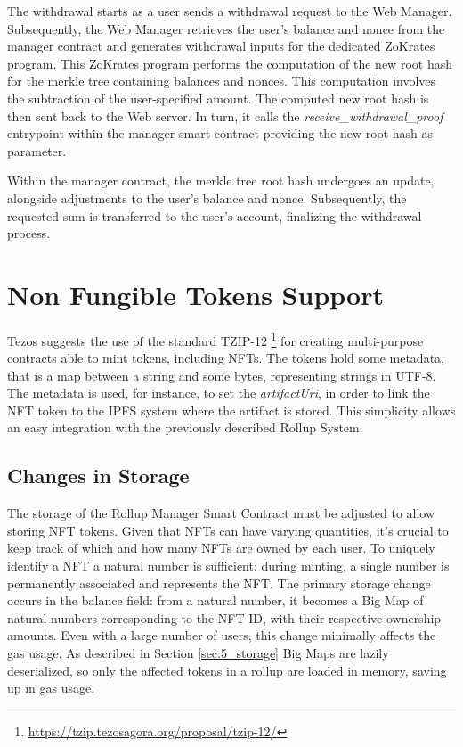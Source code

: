 The withdrawal starts as a user sends a withdrawal request to the Web Manager. Subsequently, the Web Manager retrieves the user's balance and nonce from the manager contract and generates withdrawal inputs for the dedicated ZoKrates program. This ZoKrates program performs the computation of the new root hash for the merkle tree containing balances and nonces. This computation involves the subtraction of the user-specified amount. The computed new root hash is then sent back to the Web server. In turn, it calls the \textit{receive\_withdrawal\_proof} entrypoint within the manager smart contract providing the new root hash as parameter.

Within the manager contract, the merkle tree root hash undergoes an update, alongside adjustments to the user's balance and nonce. Subsequently, the requested sum is transferred to the user's account, finalizing the withdrawal process.

\section{Non Fungible Tokens Support}

Tezos suggests the use of the standard TZIP-12 \footnote{\url{https://tzip.tezosagora.org/proposal/tzip-12/}} for creating multi-purpose contracts able to mint tokens, including NFTs. The tokens hold some metadata, that is a map between a string and some bytes, representing strings in UTF-8. The metadata is used, for instance, to set the \textit{artifactUri}, in order to link the NFT token to the IPFS system where the artifact is stored. This simplicity allows an easy integration with the previously described Rollup System.

\subsection{Changes in Storage}

The storage of the Rollup Manager Smart Contract must be adjusted to allow storing NFT tokens. Given that NFTs can have varying quantities, it's crucial to keep track of which and how many NFTs are owned by each user. To uniquely identify a NFT a natural number is sufficient: during minting, a single number is permanently associated and represents the NFT. The primary storage change occurs in the balance field: from a natural number, it becomes a Big Map of natural numbers corresponding to the NFT ID, with their respective ownership amounts. Even with a large number of users, this change minimally affects the gas usage. As described in Section \ref{sec:5_storage} Big Maps are lazily deserialized, so only the affected tokens in a rollup are loaded in memory, saving up in gas usage.

